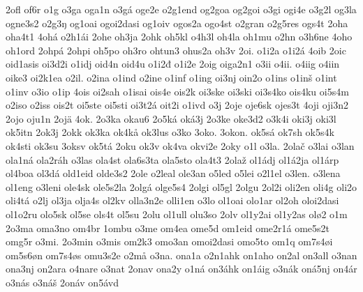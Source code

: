 {    2ofl
    of6r
    o1g
    o3ga
    oga1n
    o3gá
    oge2e
    o2g1end
    og2goa
    og2goi
    o3gi
    ogi4e
    o3g2l
    og3la
    ogne3s2
    o2g3ŋ
    og1oai
    ogoi2dasi
    og1oiv
    ogos2a
    ogo4st
    o2gran
    o2g5res
    ogs4t
    2oha
    oha4t1
    4ohá
    o2h1ái
    2ohe
    oh3ja
    2ohk
    oh5kl
    o4h3l
    oh4la
    oh1mu
    o2hn
    o3h6ne
    4oho
    oh1ord
    2ohpá
    2ohpi
    oh5po
    oh3ro
    ohtun3
    ohus2a
    oh3v
    2oi.
    o1i2a
    o1i2á
    4oib
    2oic
    oid1asis
    oi3d2i
    o1idj
    oid4n
    oid4u
    o1i2đ
    o1i2e
    2oig
    oiga2n1
    o3ii
    o4ii.
    o4iig
    o4iin
    oike3
    oi2k1ea
    o2il.
    o2ina
    o1ind
    o2ine
    o1inf
    o1ing
    oi3nj
    oin2o
    o1ins
    o1inš
    o1int
    o1inv
    o3io
    o1ip
    4ois
    oi2sah
    o1isai
    ois4e
    ois2k
    oi3ske
    oi3ski
    oi3s4ko
    ois4ku
    oi5s4m
    o2iso
    o2iss
    ois2t
    oi5ste
    oi5sti
    oi3t2á
    oit2i
    o1ivd
    o3j
    2oje
    oje6sk
    ojes3t
    4oji
    oji3n2
    2ojo
    oju1n
    2ojä
    4ok.
    2o3ka
    okau6
    2o5ká
    oká3j
    2o3ke
    oke3d2
    o3k4i
    oki3j
    oki3l
    ok5itn
    2ok3j
    2okk
    ok3ka
    ok4kå
    ok3lus
    o3ko
    3oko.
    3okon.
    ok5sá
    ok7sh
    ok5s4k
    ok4sti
    ok3su
    3oksv
    ok5tá
    2oku
    ok3v
    ok4va
    okvi2e
    2oky
    o1l
    o3la.
    2olač
    o3lai
    o3lan
    ola1ná
    ola2ráh
    o3las
    ola4st
    ola6s3ta
    ola5sto
    ola4t3
    2olaž
    ol1ádj
    ol1á2ja
    ol1árp
    ol4boa
    ol3dá
    old1eid
    olde3s2
    2ole
    o2leal
    ole3an
    o5led
    o5lei
    o2l1el
    o3len.
    o3lena
    ol1eng
    o3leni
    ole4sk
    ole5s2la
    2olgá
    olge5s4
    2olgi
    ol5gl
    2olgu
    2ol2i
    oli2en
    oli4g
    oli2o
    oli4tá
    o2lj
    ol3ja
    olja4s
    ol2kv
    olla3n2e
    olli1en
    o3lo
    ol1oai
    olo1ar
    ol2oh
    oloi2dasi
    ol1o2ru
    olo5sk
    ol5se
    ols4t
    ol5su
    2olu
    ol1ull
    olu3so
    2olv
    ol1y2ai
    ol1y2as
    olø2
    o1m
    2o3ma
    oma3no
    om4br
    1ombu
    o3me
    om4ea
    ome5d
    om1eid
    ome2r1á
    ome5s2t
    omg5r
    o3mi.
    2o3min
    o3mis
    om2k3
    omo3an
    omoi2dasi
    omo5to
    om1q
    om7s4øi
    om5s6øn
    om7s4øs
    omu3s2e
    o2må
    o3na.
    ona1a
    o2n1ahk
    on1aho
    on2al
    on3all
    o3nan
    ona3nj
    on2ara
    o4nare
    o3nat
    2onav
    ona2y
    o1ná
    on3áhk
    on1áig
    o3nák
    oná5nj
    on4ár
    o3nás
    o3náš
    2onáv
    on5ávd
}
